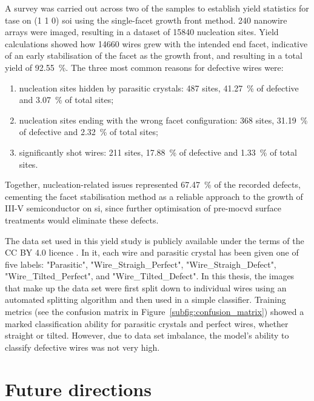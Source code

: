 A survey was carried out across two of the samples to establish yield statistics for \acs{tase} on \hkl(1 1 0) \acs{soi} using the single-facet  growth front method. \num{240} nanowire arrays were imaged, resulting in a dataset of \num{15840} nucleation sites. Yield calculations showed how \num{14660} wires grew with the intended end facet, indicative of an early stabilisation of the  facet as the growth front, and resulting in a total yield of \qty{92.55}{\%}. The three most common reasons for defective wires were:

\begin{enumerate}
    \item nucleation sites hidden by parasitic crystals: \num{487} sites, \qty{41.27}{\percent} of defective and \qty{3.07}{\percent} of total sites;
    \item nucleation sites ending with the wrong facet configuration: \num{368} sites, \qty{31.19}{\percent} of defective and \qty{2.32}{\percent} of total sites;
    \item significantly shot wires: \num{211} sites, \qty{17.88}{\percent} of defective and \qty{1.33}{\percent} of total sites.
\end{enumerate}

Together, nucleation-related issues represented \qty{67.47}{\percent} of the recorded defects, cementing the facet stabilisation method as a reliable approach to the growth of III-V semiconductor on \acl{si}, since further optimisation of pre-\acs{mocvd} surface treatments would eliminate these defects.

The data set used in this yield study is publicly available \cite{dataset} under the terms of the CC BY 4.0 licence \cite{CCBY40}. In it, each wire and parasitic crystal has been given one of five labels: "Parasitic", "Wire\_Straigh\_Perfect", "Wire\_Straigh\_Defect", "Wire\_Tilted\_Perfect", and "Wire\_Tilted\_Defect". In this thesis, the images that make up the data set were first split down to individual wires using an automated splitting algorithm \cite{code} and then used in a simple classifier. Training metrics (see the confusion matrix in Figure~\ref{subfig:confusion_matrix}) showed a marked classification ability for parasitic crystals and perfect wires, whether straight or tilted. However, due to data set imbalance, the model's ability to classify defective wires was not very high.

\section{Future directions}

